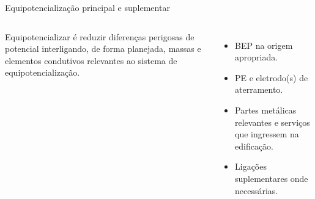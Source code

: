 \begin{frame}{Equipotencialização principal e suplementar}
\small
\begin{columns}[T,onlytextwidth]
\begin{caixaDef}
Equipotencializar é reduzir diferenças perigosas de potencial interligando, de forma planejada, massas e elementos condutivos relevantes ao sistema de equipotencialização.
\end{caixaDef}
\begin{itemize}
\item BEP na origem apropriada.
\item PE e eletrodo(s) de aterramento.
\item Partes metálicas relevantes e serviços que ingressem na edificação.
\item Ligações suplementares onde necessárias.
\end{itemize}
\centering
{}
\end{columns}
\end{frame}

